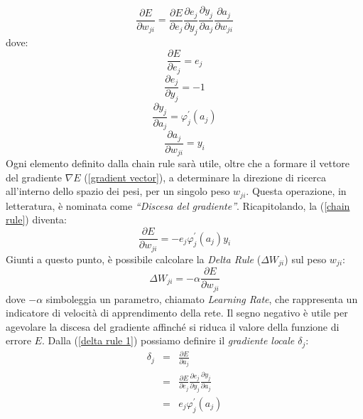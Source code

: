 \begin{equation}\label{chain rule}
    \frac{\partial E}{\partial w_{ji}} = \frac{\partial E}{\partial e_{j}} 
    \frac{\partial e_{j}}{\partial y_{j}}
    \frac{\partial y_{j}}{\partial a_{j}}
    \frac{\partial a_{j}}{\partial w_{ji}}
\end{equation}
dove:
\begin{equation}\label{derivation solved 1}
    \frac{\partial E}{\partial e_{j}} = e_j
\end{equation}
\begin{equation}\label{derivation solved 2}
    \frac{\partial e_{j}}{\partial y_{j}} = -1
\end{equation}
\begin{equation}\label{derivation solved 3}
    \frac{\partial y_{j}}{\partial a_{j}} = \varphi_j^{'}(a_j)
\end{equation}
\begin{equation}\label{derivation solved 4}
    \frac{\partial a_{j}}{\partial w_{ji}} = y_i
\end{equation}
Ogni elemento definito dalla chain rule sarà utile, oltre che a formare il vettore 
del gradiente $\nabla{E}$ (\ref{gradient vector}), a determinare la direzione di ricerca all'interno dello spazio 
dei pesi, per un singolo peso $w_{ji}$. Questa operazione, in letteratura, è nominata 
come \emph{“Discesa del gradiente”}. Ricapitolando, la (\ref{chain rule}) diventa:
\begin{equation}\label{chain rule update}
    \frac{\partial E}{\partial w_{ji}} = -e_j\varphi_j^{'}(a_j)y_i
\end{equation}
Giunti a questo punto, è possibile calcolare la \emph{Delta Rule} ($\Delta{W_{ji}}$) sul peso $w_{ji}$:
\begin{equation}\label{delta rule 1}
    \Delta{W_{ji}} = -\alpha \frac{\partial E}{\partial w_{ji}}
\end{equation}
dove $-\alpha$ simboleggia un parametro, chiamato \emph{Learning Rate}, che rappresenta 
un indicatore di velocità di apprendimento della rete. Il segno negativo è utile 
per agevolare la discesa del gradiente affinché si riduca il valore della funzione di
errore $E$. Dalla (\ref{delta rule 1}) possiamo definire il \emph{gradiente locale $\delta_j$}:
\begin{eqnarray}\label{local gradient of output layer}
    \delta_j & = & \frac{\partial E}{\partial a_{j}} \nonumber \\
             & = & \frac{\partial E}{\partial e_{j}} \frac{\partial e_{j}}{\partial y_{j}} \frac{\partial y_{j}}{\partial a_{j}} \nonumber \\
             & = & e_j\varphi_j^{'}(a_j)
\end{eqnarray}
